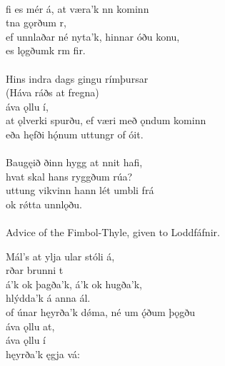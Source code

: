  \\

\bva {}fi es mér á, \hld at væra'k nn kominn \\%
\ind {}tna gǫrðum r, \\%
ef unnlaðar né nyta'k, \hld hinnar óðu konu, \\%
\ind es lǫgðumk rm fir.\\%

 \\

\bva Hins indra dags \hld gingu rímþursar \\%
\ind (Háva ráðs at fregna) \\%
\ind {}áva ǫllu í, \\%
at ǫlverki spurðu, \hld ef væri með ǫndum kominn \\%
\ind eða hęfði hǫ́num uttungr of óit.\\%

 \\

\bva Baugęið ðinn \hld hygg at nnit hafi, \\%
\ind hvat skal hans ryggðum rúa? \\%
uttung vikvinn \hld hann lét umbli frá \\%
\ind ok rǿtta unnlǫðu.\\%

 \\

	Advice of the Fimbol-Thyle, given to Loddfáfnir.

\bva Mál's at ylja \hld {}ular stóli á, \\%
\ind {}rðar brunni t \\%
á'k ok þagða'k, \hld {}á'k ok hugða'k, \\%
\ind hlýdda'k á anna ál. \\%
of únar hęyrða'k dǿma, \hld né um ǫ́ðum þǫgðu \\%
\ind {}áva ǫllu at, \\%
\ind {}áva ǫllu í \\%
\ind hęyrða'k ęgja vá:\\%

 \\

